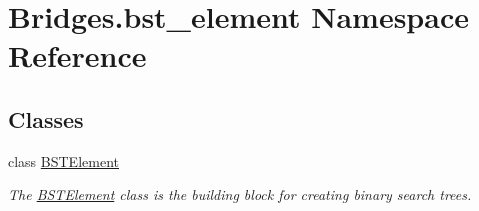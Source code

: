 \hypertarget{namespace_bridges_1_1bst__element}{}\section{Bridges.\+bst\+\_\+element Namespace Reference}
\label{namespace_bridges_1_1bst__element}
\subsection*{Classes}
\begin{DoxyCompactItemize}
\item 
class \hyperlink{class_bridges_1_1bst__element_1_1_b_s_t_element}{B\+S\+T\+Element}
\begin{DoxyCompactList}\small\item\em The \hyperlink{class_bridges_1_1bst__element_1_1_b_s_t_element}{B\+S\+T\+Element} class is the building block for creating binary search trees. \end{DoxyCompactList}\end{DoxyCompactItemize}
